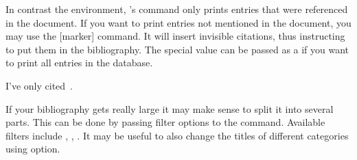 In contrast the  environment, 's
 command only prints entries that were referenced in the
document. If you want to print entries not mentioned in the document, you may
use the [marker] command. It will insert invisible citations, thus
instructing  to put them in the bibliography. The special value
\cargv{*} can be passed as a  if you want to print all entries in
the database.
\begin{example}[standalone,
  biber,
  biber_dir=../src/examples/,
  paperwidth=7cm,
  paperheight=7cm,
]
\usepackage{biblatex}


\setlength{\parindent}{0pt}
I've only cited~\cite{lshort}.

\nocite{*}
\printbibliography

\end{example}

If your bibliography gets really large it may make sense to split it into
several parts. This can be done by passing filter options to the
 command. Available filters include ,
, . It may be useful to also change the titles of
different categories using  option.

\begin{example}[standalone,
  biber,
  biber_dir=../src/examples/,
  paperwidth=7cm,
  paperheight=6cm,
]
\usepackage{biblatex}


\setlength{\parindent}{0pt}
\nocite{*}
\printbibliography[
  type=book,
  title=Books I've referenced
]

\printbibliography[
  keyword=unreliable,
  title=Don't trust those
]

\end{example}

